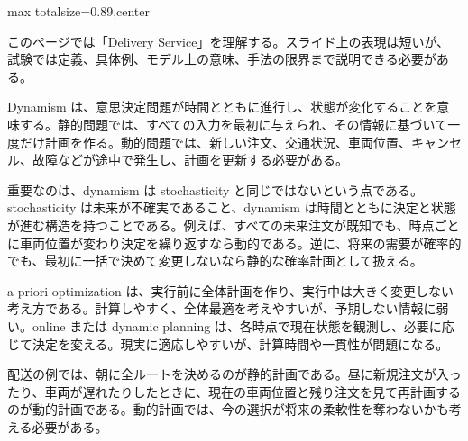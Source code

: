 \begin{minipage}[t]{0.58\textwidth}
\begin{adjustbox}{max totalsize={\textwidth}{0.89\textheight},center}
\begin{minipage}{\textwidth}\scriptsize
{}このページでは「Delivery Service」を理解する。スライド上の表現は短いが、試験では定義、具体例、モデル上の意味、手法の限界まで説明できる必要がある。\par
Dynamism は、意思決定問題が時間とともに進行し、状態が変化することを意味する。静的問題では、すべての入力を最初に与えられ、その情報に基づいて一度だけ計画を作る。動的問題では、新しい注文、交通状況、車両位置、キャンセル、故障などが途中で発生し、計画を更新する必要がある。\par
重要なのは、dynamism は stochasticity と同じではないという点である。stochasticity は未来が不確実であること、dynamism は時間とともに決定と状態が進む構造を持つことである。例えば、すべての未来注文が既知でも、時点ごとに車両位置が変わり決定を繰り返すなら動的である。逆に、将来の需要が確率的でも、最初に一括で決めて変更しないなら静的な確率計画として扱える。\par
a priori optimization は、実行前に全体計画を作り、実行中は大きく変更しない考え方である。計算しやすく、全体最適を考えやすいが、予期しない情報に弱い。online または dynamic planning は、各時点で現在状態を観測し、必要に応じて決定を変える。現実に適応しやすいが、計算時間や一貫性が問題になる。\par
配送の例では、朝に全ルートを決めるのが静的計画である。昼に新規注文が入ったり、車両が遅れたりしたときに、現在の車両位置と残り注文を見て再計画するのが動的計画である。動的計画では、今の選択が将来の柔軟性を奪わないかも考える必要がある。\par

\end{minipage}
\end{adjustbox}
\end{minipage}
